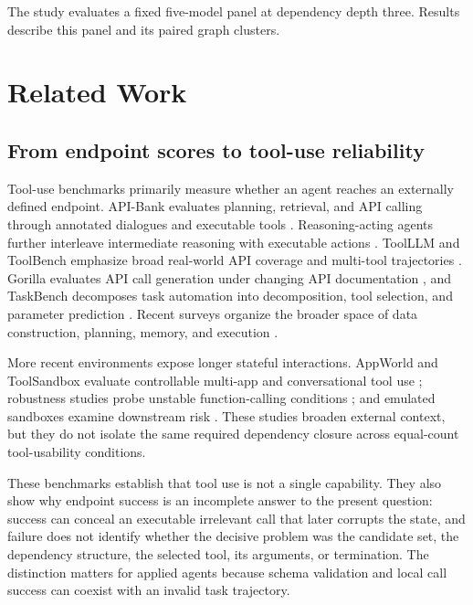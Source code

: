 \documentclass[pdflatex,sn-basic]{sn-jnl}
\begin{document}
The study evaluates a fixed five-model panel at dependency depth three. Results
describe this panel and its paired graph clusters.

\section{Related Work}

\subsection{From endpoint scores to tool-use reliability}

Tool-use benchmarks primarily measure whether an agent reaches an externally
defined endpoint. API-Bank evaluates planning, retrieval, and API calling
through annotated dialogues and executable tools \citep{li2023apibank}.
Reasoning-acting agents further interleave intermediate reasoning with executable
actions \citep{yao2023react}. ToolLLM
and ToolBench emphasize broad real-world API coverage and multi-tool trajectories
\citep{qin2023toolllm}. Gorilla evaluates API call generation under changing API
documentation \citep{patil2023gorilla}, and TaskBench decomposes task automation
into decomposition, tool selection, and parameter prediction
\citep{shen2024taskbench}. Recent surveys organize the broader space of data
construction, planning, memory, and execution \citep{qu2025toollearning}.

More recent environments expose longer stateful interactions. AppWorld and
ToolSandbox evaluate controllable multi-app and conversational tool use
\citep{trivedi2024appworld,lu2025toolsandbox}; robustness studies probe unstable
function-calling conditions \citep{rabinovich2025robust}; and emulated sandboxes
examine downstream risk \citep{ruan2024toolemu}. These studies broaden external
context, but they do not isolate the same required dependency closure across
equal-count tool-usability conditions.

These benchmarks establish that tool use is not a single capability. They also
show why endpoint success is an incomplete answer to the present question:
success can conceal an executable irrelevant call that later corrupts the state,
and failure does not identify whether the decisive problem was the candidate
set, the dependency structure, the selected tool, its arguments, or termination.
The distinction matters for applied agents because schema validation and local
call success can coexist with an invalid task trajectory.
\end{document}
